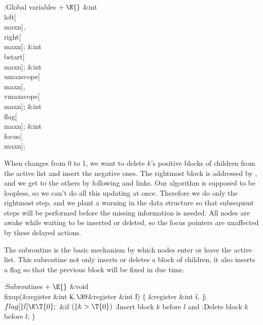 \B{}:Global variables\X${}\mathrel+\E{}$\6
\&{int} \\{left}[\\{maxn}]${},{}$ \\{right}[\\{maxn}];\6
\&{int} \\{bstart}[\\{maxn}];\6
\&{int} \\{umaxscope}[\\{maxn}]${},{}$ \\{vmaxscope}[\\{maxn}];\6
\&{int} \\{flag}[\\{maxn}];\6
\&{int} \\{focus}[\\{maxn}];\par
\fi

When  changes from 0 to 1, we want to delete $k$'s
positive blocks of
children from the active list and insert the negative ones. The rightmost
block is addressed by , and we get to the others by
following
 and  links. Our algorithm is supposed to be
loopless, so we
can't do all this updating at once. Therefore we do only the rightmost step,
and we plant a warning in the data structure so that subsequent steps
will be performed before the missing information is needed. All nodes are
awake while waiting to be inserted or deleted, so the focus pointers are
unaffected by these delayed actions.

The  subroutine is the basic mechanism by which nodes
enter or leave the active list. This subroutine not only inserts
or deletes a block of children, it also inserts a flag so that
the previous block will be fixed in due time.

\Y\B\4:Subroutines\X${}\mathrel+\E{}$\6
\&{void} \\{fixup}(\&{register} \&{int} \|k${},\39{}$\&{register} \&{int} \|l)%
\1\1\2\2\6
${}\{{}$\1\6
\&{register} \&{int} \|i${},{}$ \|j;\7
${}\\{flag}[\|l]\K\T{0};{}$\6
\&{if} ${}(\|k>\T{0}){}$\1\5
:Insert block $k$ before $l$ and \X\2\6
:Delete block $k$ before $l$\X;\6
\4${}\}{}$\2\par
\fi

